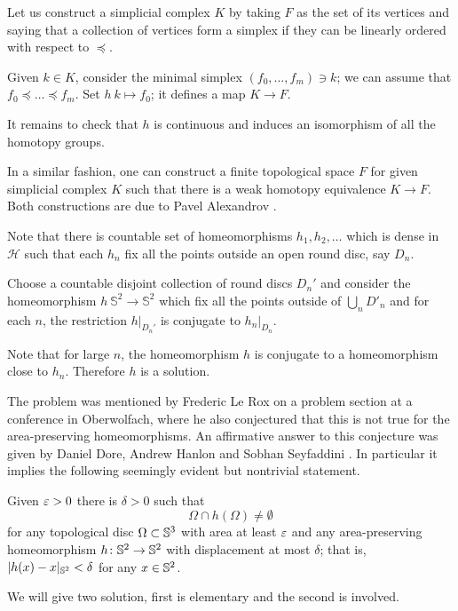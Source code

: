 Let us construct a simplicial complex $K$ 
by taking $F$ as the set of its vertices
and saying that a collection of vertices form a simplex 
if they can be linearly ordered with respect to $\preccurlyeq$.

Given $k\in K$,
consider the minimal simplex $(f_0,\dots,f_m)\ni k$;
we can assume that $f_0\preccurlyeq \dots\preccurlyeq f_m$.
Set $h\:k\mapsto f_0$;
it defines a map $K\to F$.

It remains to check that $h$ is continuous 
and induces an isomorphism of all the homotopy groups.
\qeds

In a similar fashion, one can construct a finite topological space $F$ for given simplicial complex $K$ 
such that 
there is a weak homotopy equivalence $K\to F$.
Both constructions are due to Pavel Alexandrov
\cite[see][]{alexandrov-finite,mccord}.

Note that there is countable set of homeomorphisms $h_1,h_2,\dots$ which is dense in $\mathcal{H}$
such that
each $h_n$ fix all the points outside an open round disc, say $D_n$.

Choose a countable disjoint collection of round discs $D_n'$
and consider the homeomorphism $h\:\mathbb S^2\to \mathbb S^2$
which fix all the points outside of $\bigcup_nD'_n$ and
for each $n$,
the restriction $h|_{D_n'}$ is conjugate to $h_n|_{D_n}$. 


Note that for large $n$, the homeomorphism $h$ is conjugate to a homeomorphism close to $h_n$.
Therefore $h$ is a solution.
\qeds

The problem was mentioned by Frederic Le Rox \cite[see][]{rox} on a problem section at a conference in Oberwolfach, 
where he also conjectured that this is not true for the area-preserving homeomorphisms.
An affirmative answer to this conjecture was given by Daniel Dore, Andrew Hanlon and Sobhan Seyfaddini 
\cite[see][]{dore-hanlon,seyfaddini}.
In particular it implies the following seemingly evident but nontrivial statement.

\begin{pr}
Given $\varepsilon>0$ there is $\delta>0$ such that 
\[\Omega\cap h(\Omega)\ne\emptyset\]
for any topological disc $\Omega\subset \mathbb{S}^3$ with area at least $\varepsilon$
and 
any area-preserving homeomorphism $h\colon\mathbb{S}^2\to\mathbb{S}^2$ with displacement at most $\delta$;
that is, $|h(x)-x|_{\mathbb{S}^2}<\delta$ for any $x\in \mathbb{S}^2$. 
\end{pr}


We will give two solution, first is elementary and the second is involved. 

